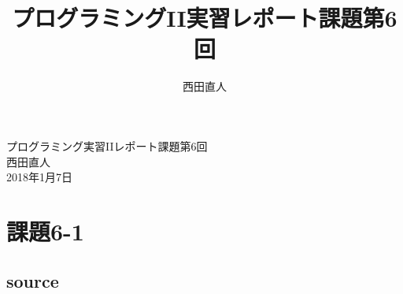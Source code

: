 \documentclass[10pt,a4paper]{jsarticle}
\title{プログラミングII実習レポート課題第6回}
\author{西田直人}
\begin{document}
\begin{center}
{\LARGE プログラミング実習IIレポート課題第6回} \\
\large
西田直人 \\ 2018年1月7日
\end{center}
\normalsize
\section{課題6-1}

\subsection{source}
\end{document}
